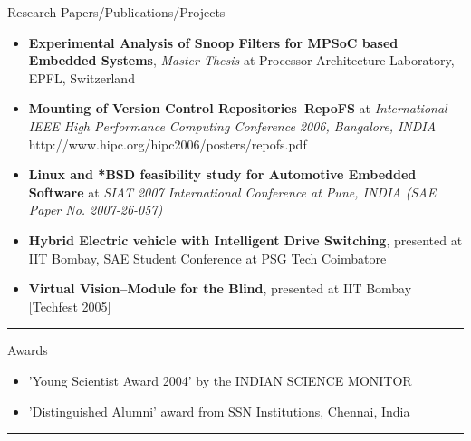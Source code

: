 \documentclass[11pt,oneside]{article}
\newenvironment{ressection}[1]{
	\vspace{4pt}
	{\fontfamily{phv}\selectfont\Large#1}
	\begin{itemize}
	\vspace{3pt}
}{
	\end{itemize}
}
\newcommand{\resitem}[1]{
	\vspace{-4pt}
	\item \begin{flushleft} #1 \end{flushleft}
}
\begin{document}
\begin{ressection}{Research Papers/Publications/Projects}
      \resitem{\textbf{Experimental Analysis of Snoop Filters for MPSoC based
          Embedded Systems}, \emph{Master Thesis} at Processor Architecture
        Laboratory, EPFL, Switzerland}
        
      \resitem{\textbf{Mounting of Version Control Repositories--RepoFS} at
        \emph{International IEEE High Performance Computing Conference 2006,
          Bangalore, INDIA} http://www.hipc.org/hipc2006/posters/repofs.pdf}
    
      \resitem{\textbf{Linux and *BSD feasibility study for Automotive
          Embedded Software} at \emph{SIAT 2007 International Conference at
          Pune, INDIA (SAE Paper No. 2007-26-057)}}

      \resitem{\textbf{Hybrid Electric vehicle with Intelligent Drive
          Switching}, presented at IIT Bombay, SAE Student Conference at PSG
        Tech Coimbatore}

      \resitem{\textbf{Virtual Vision--Module for the Blind}, presented at IIT
        Bombay [Techfest 2005]}
\end{ressection}
\rule{\textwidth}{.5pt}

\begin{ressection}{Awards}
        
        \resitem{'Young Scientist Award 2004' by the INDIAN SCIENCE MONITOR}
        \resitem{'Distinguished Alumni' award from SSN Institutions,
            Chennai, India}

\end{ressection}
\rule{\textwidth}{.5pt}




    




\end{document}
